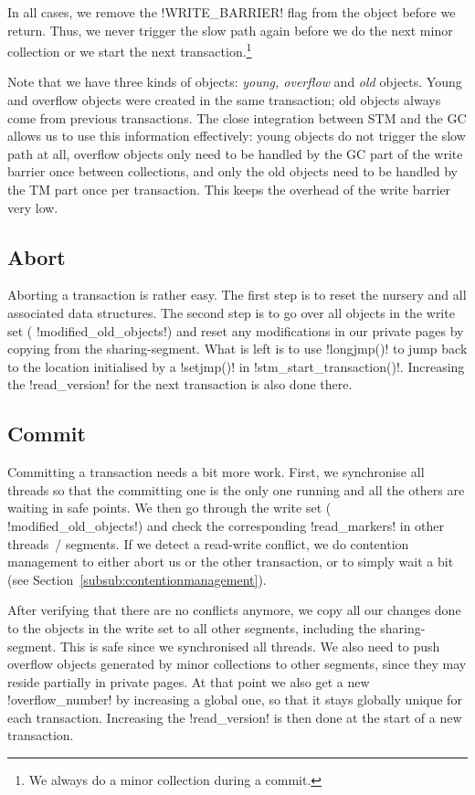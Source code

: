 \documentclass{sigplanconf}
\makeatletter
\renewcommand\lstinline[1][]{%
  \Collectverb{\@@myverb}%
}
\def\@@myverb#1{%
    \begingroup
    \fboxsep=0.2em
    \colorbox{verylightgray}{\oldlstinline|#1|}%
    \endgroup
}
\makeatother
\begin{document}
In all cases, we remove the \lstinline!WRITE_BARRIER!  flag from the
object before we return. Thus, we never trigger the slow path again
before we do the next minor collection or we start the next
transaction.\footnote{We always do a minor collection during a commit.}

Note that we have three kinds of objects: \emph{young, overflow} and
\emph{old} objects. Young and overflow objects were created in the
same transaction; old objects always come from previous transactions.
The close integration between STM and the GC allows us to use this
information effectively: young objects do not trigger the slow path at
all, overflow objects only need to be handled by the GC part of the
write barrier once between collections, and only the old objects need
to be handled by the TM part once per transaction. This keeps the
overhead of the write barrier very low.


\subsection{Abort}

Aborting a transaction is rather easy. The first step is to reset the
nursery and all associated data structures. The second step is to go
over all objects in the write set (\lstinline!modified_old_objects!)
and reset any modifications in our private pages by copying from the
sharing-segment. What is left is to use \lstinline!longjmp()!  to jump
back to the location initialised by a \lstinline!setjmp()!  in
\lstinline!stm_start_transaction()!.  Increasing the
\lstinline!read_version! for the next transaction is also done there.




\subsection{Commit}

Committing a transaction needs a bit more work. First, we synchronise
all threads so that the committing one is the only one running and all
the others are waiting in safe points. We then go through the write
set (\lstinline!modified_old_objects!)  and check the corresponding
\lstinline!read_markers!  in other threads~/ segments. If we detect a
read-write conflict, we do contention management to either abort us or
the other transaction, or to simply wait a bit (see Section~\ref{subsub:contentionmanagement}).

After verifying that there are no conflicts anymore, we copy all our
changes done to the objects in the write set to all other segments,
including the sharing-segment. This is safe since we synchronised all
threads. We also need to push overflow objects generated by minor
collections to other segments, since they may reside partially in
private pages. At that point we also get a new
\lstinline!overflow_number! by increasing a global one, so that it
stays globally unique for each transaction. Increasing the
\lstinline!read_version!  is then done at the start of a new
transaction.
\end{document}
